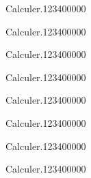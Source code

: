 \begin{pageAD} 



\begin{ExoCad}{Calculer.}{1234}{0}{0}{0}{0}{0}

\end{ExoCad}


\begin{ExoCad}{Calculer.}{1234}{0}{0}{0}{0}{0}

\end{ExoCad}


\begin{ExoCad}{Calculer.}{1234}{0}{0}{0}{0}{0}

\end{ExoCad}


\begin{ExoCad}{Calculer.}{1234}{0}{0}{0}{0}{0}

\end{ExoCad}
 
\end{pageAD} 
\begin{pageParcoursu} 
 
 
\begin{ExoCu}{Calculer.}{1234}{0}{0}{0}{0}{0}

\end{ExoCu}
 
 
\begin{ExoCu}{Calculer.}{1234}{0}{0}{0}{0}{0}

\end{ExoCu}
 
 
\begin{ExoCu}{Calculer.}{1234}{0}{0}{0}{0}{0}

\end{ExoCu}
 
 
\begin{ExoCu}{Calculer.}{1234}{0}{0}{0}{0}{0}

\end{ExoCu} 
 

\end{pageParcoursu}
